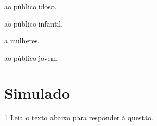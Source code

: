 \begin{escolha}

    \item ao público idoso.

    \item ao público infantil.

    \item a mulheres.

    \item ao público jovem.

\end{escolha}


\chapter[Simulado 3]{Simulado}

\num{1} Leia o texto abaixo para responder à questão. 

